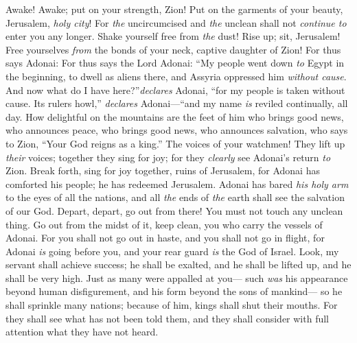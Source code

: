 \begin{biblechapter} %
 Awake! Awake; put on your strength, Zion! 
Put on the garments of your beauty, Jerusalem, \textit{holy city}! 
For \textit{the} uncircumcised and \textit{the} unclean shall not \textit{continue to} enter you any longer.
\verse Shake yourself free from \textit{the} dust! Rise up; sit, Jerusalem! 
Free yourselves \textit{from} the bonds of your neck, captive daughter of Zion!
\verse For thus says Adonai:
\verse For thus says the Lord Adonai:
\verse “My people went down \textit{to} Egypt in the beginning, to dwell as aliens there, and Assyria oppressed him \textit{without cause}.
\verse And now what do I have here?”\textit{declares} Adonai, “for my people is taken without cause. Its rulers howl,” \textit{declares} Adonai—“and my name \textit{is} reviled continually, all day.
\verse How delightful on the mountains are the feet of him who brings good news, 
who announces peace, who brings good news, who announces salvation, 
who says to Zion, “Your God reigns as a king.”
\verse The voices of your watchmen! They lift up \textit{their} voices; 
together they sing for joy; 
for they \textit{clearly} see Adonai’s return \textit{to} Zion.
\verse Break forth, 
sing for joy together, ruins of Jerusalem, 
for Adonai has comforted his people; 
he has redeemed Jerusalem.
\verse Adonai has bared \textit{his holy arm} to the eyes of all the nations, 
and all \textit{the} ends of \textit{the} earth shall see the salvation of our God.
\verse Depart, depart, go out from there! You must not touch any unclean thing. 
Go out from the midst of it, keep clean, you who carry the vessels of Adonai.
\verse For you shall not go out in haste, 
and you shall not go in flight, 
for Adonai \textit{is} going before you, 
and your rear guard \textit{is} the God of Israel.
 Look, my servant shall achieve success; 
he shall be exalted, 
and he shall be lifted up, 
and he shall be very high.
\verse Just as many were appalled at you— 
such \textit{was} his appearance beyond human disfigurement, 
and his form beyond the sons of mankind—
\verse so he shall sprinkle many nations; 
because of him, kings shall shut their mouths. 
For they shall see what has not been told them, 
and they shall consider with full attention what they have not heard.
\end{biblechapter}

